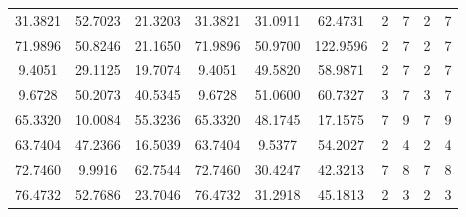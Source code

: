 \documentclass[withoutpreface,bwprint]{cumcmthesis}
\begin{document}
\begin{appendices}
\begin{table}[htbp!]
\begin{tabular}{@{}cccccccccc@{}}
				31.3821                          & 52.7023                          & 21.3203                          & 31.3821                          & 31.0911                          & 62.4731                          & 2                    & 7                    & 2                      & 7                      \\ \cmidrule(lr){7-7}
				71.9896                          & 50.8246                          & 21.1650                          & 71.9896                          & 50.9700                          & 122.9596                         & 2                    & 7                    & 2                      & 7                      \\
				9.4051                           & 29.1125                          & 19.7074                          & 9.4051                           & 49.5820                          & 58.9871                          & 2                    & 7                    & 2                      & 7                      \\
				9.6728                           & 50.2073                          & 40.5345                          & 9.6728                           & 51.0600                          & 60.7327                          & 3                    & 7                    & 3                      & 7                      \\
				65.3320                          & 10.0084                          & 55.3236                          & 65.3320                          & 48.1745                          & 17.1575                          & 7                    & 9                    & 7                      & 9                      \\
				63.7404                          & 47.2366                          & 16.5039                          & 63.7404                          & 9.5377                           & 54.2027                          & 2                    & 4                    & 2                      & 4                      \\
				72.7460                          & 9.9916                           & 62.7544                          & 72.7460                          & 30.4247                          & 42.3213                          & 7                    & 8                    & 7                      & 8                      \\
				76.4732                          & 52.7686                          & 23.7046                          & 76.4732                          & 31.2918                          & 45.1813                          & 2                    & 3                    & 2                      & 3                      \\

\end{tabular}
\end{table}
\end{appendices}
\end{document}
